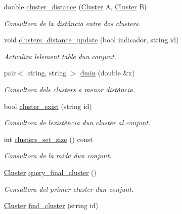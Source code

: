 \begin{DoxyCompactItemize}
double \hyperlink{class_cjt___clusters_acd0e381a6b4c43933b3c6761febf9b3e}{cluster\+\_\+distance} (\hyperlink{class_cluster}{Cluster} A, \hyperlink{class_cluster}{Cluster} B)
\begin{DoxyCompactList}\small\item\em Consultora de la distància entre dos clusters. \end{DoxyCompactList}\item 
void \hyperlink{class_cjt___clusters_ad794d3d1b0df7adb7fbb35d21634f5a0}{clusters\+\_\+distance\+\_\+update} (bool indicador, string id)
\begin{DoxyCompactList}\small\item\em Actualiza l\textquotesingle{}element table d\textquotesingle{}un conjunt. \end{DoxyCompactList}\item 
pair$<$ string, string $>$ \hyperlink{class_cjt___clusters_a3db57ec9903b4f5439679ac9ba41fab1}{dmin} (double \&x)
\begin{DoxyCompactList}\small\item\em Consultora dels clusters a menor distància. \end{DoxyCompactList}\item 
bool \hyperlink{class_cjt___clusters_aaa57cbd8d86567b4403ac9adb34a87f5}{cluster\+\_\+exist} (string id)
\begin{DoxyCompactList}\small\item\em Consultora de l\textquotesingle{}existència d\textquotesingle{}un cluster al conjunt. \end{DoxyCompactList}\item 
int \hyperlink{class_cjt___clusters_a1ecfc9a82c3a0dff467769880c355efd}{clusters\+\_\+set\+\_\+size} () const
\begin{DoxyCompactList}\small\item\em Consultora de la mida d\textquotesingle{}un conjunt. \end{DoxyCompactList}\item 
\hyperlink{class_cluster}{Cluster} \hyperlink{class_cjt___clusters_a48cb7ca0417ba1de9593a00f98d91880}{query\+\_\+final\+\_\+cluster} ()
\begin{DoxyCompactList}\small\item\em Consultora del primer cluster d\textquotesingle{}un conjunt. \end{DoxyCompactList}\item 
\hyperlink{class_cluster}{Cluster} \hyperlink{class_cjt___clusters_a4ab91d8e8222f35b4c9592c5ab2b4bf3}{find\+\_\+cluster} (string id)

\end{DoxyCompactItemize}
